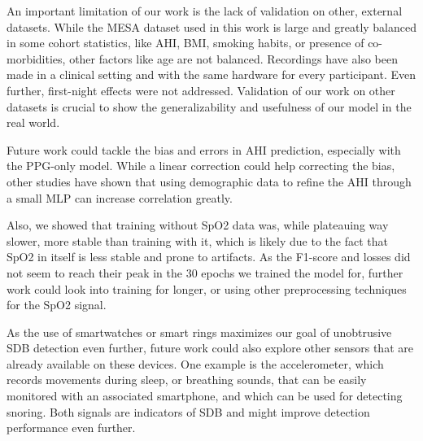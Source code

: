 
An important limitation of our work is the lack of validation on other, external datasets. While the MESA dataset used in this work is large and greatly balanced in some cohort statistics, like AHI, BMI, smoking habits, or presence of co-morbidities, other factors like age are not balanced. Recordings have also been made in a clinical setting and with the same hardware for every participant. Even further, first-night effects were not addressed.
Validation of our work on other datasets is crucial to show the generalizability and usefulness of our model in the real world.


Future work could tackle the bias and errors in AHI prediction, especially with the PPG-only model. While a linear correction could help correcting the bias, other studies have shown that using demographic data to refine the AHI through a small MLP can increase correlation greatly.

Also, we showed that training without SpO2 data was, while plateauing way slower, more stable than training with it, which is likely due to the fact that SpO2 in itself is less stable and prone to artifacts. As the F1-score and losses did not seem to reach their peak in the 30 epochs we trained the model for, further work could look into training for longer, or using other preprocessing techniques for the SpO2 signal.

As the use of smartwatches or smart rings maximizes our goal of unobtrusive SDB detection even further, future work could also explore other sensors that are already available on these devices. One example is the accelerometer, which records movements during sleep, or breathing sounds, that can be easily monitored with an associated smartphone, and which can be used for detecting snoring. Both signals are indicators of SDB and might improve detection performance even further.